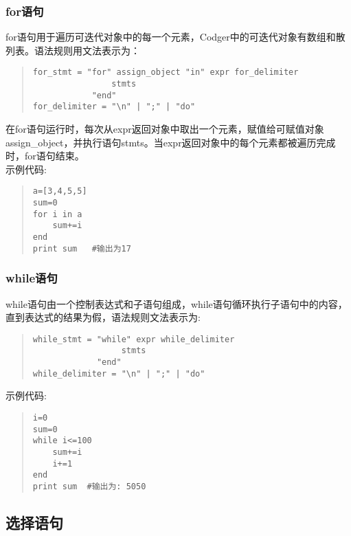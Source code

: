 \subsubsection{for语句}
for语句用于遍历可迭代对象中的每一个元素，Codger中的可迭代对象有数组和散列表。语法规则用文法表示为：
\begin{quote}
\begin{verbatim}
for_stmt = "for" assign_object "in" expr for_delimiter
                stmts
            "end"
for_delimiter = "\n" | ";" | "do"
\end{verbatim}
\end{quote}
在for语句运行时，每次从expr返回对象中取出一个元素，赋值给可赋值对象assign\_object，并执行语句stmts。当expr返回对象中的每个元素都被遍历完成时，for语句结束。\\
示例代码:
\begin{quote}
\begin{verbatim}
a=[3,4,5,5]
sum=0
for i in a
    sum+=i
end
print sum   #输出为17
\end{verbatim}
\end{quote}

\subsubsection{while语句}
while语句由一个控制表达式和子语句组成，while语句循环执行子语句中的内容，直到表达式的结果为假，语法规则文法表示为:
\begin{quote}
\begin{verbatim}
while_stmt = "while" expr while_delimiter
                  stmts
             "end"
while_delimiter = "\n" | ";" | "do"
\end{verbatim}
\end{quote}
示例代码:
\begin{quote}
\begin{verbatim}
i=0
sum=0
while i<=100
    sum+=i
    i+=1
end 
print sum  #输出为: 5050
\end{verbatim}
\end{quote}

\subsection{选择语句}
